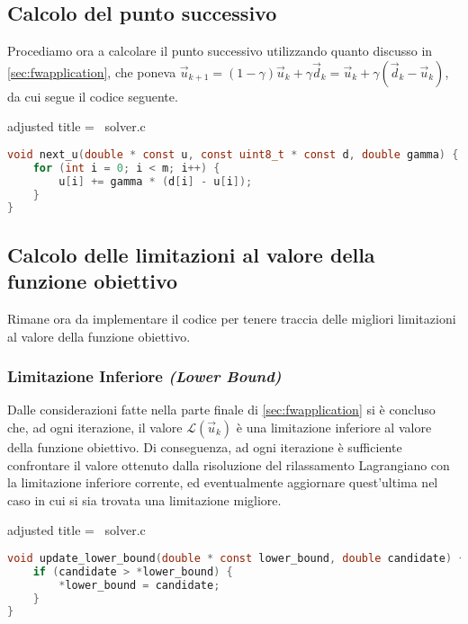 \subsection{Calcolo del punto successivo}
Procediamo ora a calcolare il punto successivo utilizzando quanto discusso in \ref{sec:fwapplication}, che poneva
\(
\vec{u}_{k+1} = (1 - \gamma)\vec{u}_k + \gamma \vec{d}_k = \vec{u}_k + \gamma(\vec{d}_k - \vec{u}_k)
\),
da cui segue il codice seguente.
\begin{code}{adjusted title = {\cicon\ solver.c}}
\begin{lstlisting}[language=c, style = style, caption={Calcolo di \( \vec{u}_{k + 1} \).}]
void next_u(double * const u, const uint8_t * const d, double gamma) {
    for (int i = 0; i < m; i++) {
        u[i] += gamma * (d[i] - u[i]);
    }
}
\end{lstlisting}
\end{code}

\subsection{Calcolo delle limitazioni al valore della funzione obiettivo}
Rimane ora da implementare il codice per tenere traccia delle migliori limitazioni al valore della funzione
obiettivo.

\subsubsection{Limitazione Inferiore \textit{(Lower Bound)}}
Dalle considerazioni fatte nella parte finale di \ref{sec:fwapplication} si è concluso che, ad ogni iterazione, il
valore \( \mathcal{L}(\vec{u}_k) \) è una limitazione inferiore al valore della funzione obiettivo. Di conseguenza, ad
ogni iterazione è sufficiente confrontare il valore ottenuto dalla risoluzione del rilassamento Lagrangiano con la
limitazione inferiore corrente, ed eventualmente aggiornare quest'ultima nel caso in cui si sia trovata una limitazione
migliore.
\begin{code}{adjusted title = {\cicon\ solver.c}}
\begin{lstlisting}[language=c, style = style, caption={Aggiornamento della limitazione inferiore.}]
void update_lower_bound(double * const lower_bound, double candidate) {
    if (candidate > *lower_bound) {
        *lower_bound = candidate;
    }
}
\end{lstlisting}
\end{code}

